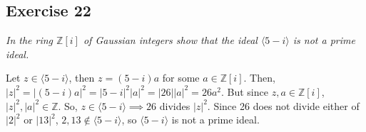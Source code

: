 \subsection*{Exercise 22}
\textit{In the ring $\mathbb{Z}[i]$ of Gaussian integers show that the ideal $\langle 5 - i \rangle$ is not a prime ideal.}

\vspace{5 mm}
Let $z \in \langle 5 - i \rangle$, then $z = (5-i)a$ for some $a \in \mathbb{Z}[i]$. Then, $|z|^2 = |(5-i)a|^2 = |5-i|^2|a|^2 = |26||a|^2 = 26a^2$. But since $z,a \in \mathbb{Z}[i]$, $|z|^2,|a|^2 \in \mathbb{Z}$. So, $z \in \langle 5 - i \rangle \implies 26$ divides $|z|^2$. Since 26 does not divide either of $|2|^2$ or $|13|^2$, $2,13 \not\in \langle 5 - i \rangle$, so $\langle 5 - i \rangle$ is not a prime ideal.